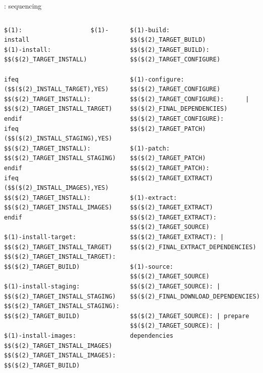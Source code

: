 \begin{frame}[fragile]{: sequencing}

  \begin{columns}
\begin{block}{}
\begin{verbatim}
$(1):                   $(1)-install
$(1)-install:           $$($(2)_TARGET_INSTALL)

ifeq ($$($(2)_INSTALL_TARGET),YES)
$$($(2)_TARGET_INSTALL): $$($(2)_TARGET_INSTALL_TARGET)
endif
ifeq ($$($(2)_INSTALL_STAGING),YES)
$$($(2)_TARGET_INSTALL): $$($(2)_TARGET_INSTALL_STAGING)
endif
ifeq ($$($(2)_INSTALL_IMAGES),YES)
$$($(2)_TARGET_INSTALL): $$($(2)_TARGET_INSTALL_IMAGES)
endif

$(1)-install-target:            $$($(2)_TARGET_INSTALL_TARGET)
$$($(2)_TARGET_INSTALL_TARGET): $$($(2)_TARGET_BUILD)

$(1)-install-staging:                   $$($(2)_TARGET_INSTALL_STAGING)
$$($(2)_TARGET_INSTALL_STAGING):        $$($(2)_TARGET_BUILD)

$(1)-install-images:            $$($(2)_TARGET_INSTALL_IMAGES)
$$($(2)_TARGET_INSTALL_IMAGES): $$($(2)_TARGET_BUILD)
\end{verbatim}
\end{block}
\begin{block}{}
\begin{verbatim}
$(1)-build:             $$($(2)_TARGET_BUILD)
$$($(2)_TARGET_BUILD):  $$($(2)_TARGET_CONFIGURE)

$(1)-configure:                 $$($(2)_TARGET_CONFIGURE)
$$($(2)_TARGET_CONFIGURE):      | $$($(2)_FINAL_DEPENDENCIES)
$$($(2)_TARGET_CONFIGURE):      $$($(2)_TARGET_PATCH)

$(1)-patch:             $$($(2)_TARGET_PATCH)
$$($(2)_TARGET_PATCH):  $$($(2)_TARGET_EXTRACT)

$(1)-extract:                   $$($(2)_TARGET_EXTRACT)
$$($(2)_TARGET_EXTRACT):        $$($(2)_TARGET_SOURCE)
$$($(2)_TARGET_EXTRACT): | $$($(2)_FINAL_EXTRACT_DEPENDENCIES)

$(1)-source:            $$($(2)_TARGET_SOURCE)
$$($(2)_TARGET_SOURCE): | $$($(2)_FINAL_DOWNLOAD_DEPENDENCIES)

$$($(2)_TARGET_SOURCE): | prepare
$$($(2)_TARGET_SOURCE): | dependencies
\end{verbatim}
\end{block}
  \end{columns}
\end{frame}

